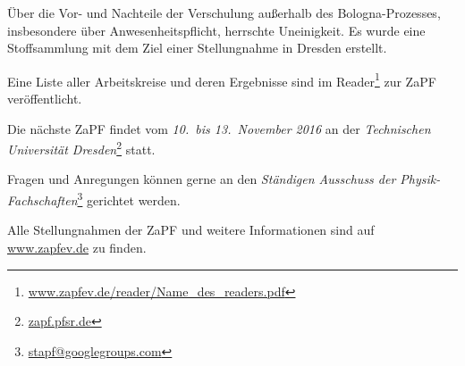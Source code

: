 Über die Vor- und Nachteile der Verschulung außerhalb des Bologna-Prozesses, 
insbesondere über Anwesenheitspflicht, herrschte Uneinigkeit. 
Es wurde eine Stoffsammlung mit dem Ziel einer Stellungnahme in Dresden erstellt.

Eine Liste aller Arbeitskreise und deren Ergebnisse sind im
Reader\footnote{\href{http://www.zapfev.de/reader/Name_des_readers.pdf}{\url{www.zapfev.de/reader/Name_des_readers.pdf}}}
zur ZaPF veröffentlicht.

\vfill

Die nächste ZaPF findet vom \emph{10.\ bis 13.\ November 2016} an der  \emph{Technischen Universität Dresden}\footnote{\href{https://zapf.pfsr.de/}{\url{zapf.pfsr.de}}} statt.

Fragen und Anregungen können gerne an den \emph{Ständigen Ausschuss der Physik-Fachschaften}\footnote{\href{mailto:stapf@googlegroups.com}{\url{stapf@googlegroups.com}}} gerichtet werden.

Alle Stellungnahmen der ZaPF und weitere Informationen sind auf \href{http://www.zapfev.de}{\url{www.zapfev.de}} zu finden.

